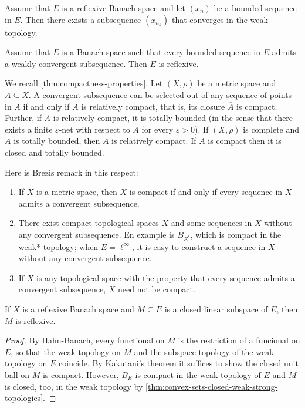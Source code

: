 \documentclass{article}
\theoremstyle{definition}
\numberwithin{equation}{section}
\begin{document}
\begin{thm}
	Assume that $E$ is a reflexive Banach space and let $(x_n)$ be a bounded sequence in $E$. Then there exists a subsequence $(x_{n_k})$ that converges in the weak topology.
\end{thm}
\begin{thm}
	Assume that $E$ is a Banach space such that every bounded sequence in $E$ admits a weakly convergent subsequence. Then $E$ is reflexive.
\end{thm}
\begin{remark}
	We recall \cref{thm:compactness-properties}. Let $(X,\rho)$ be a metric space and $A\subseteq X$. A convergent subsequence can be selected out of any sequence of points in $A$ if and only if $A$ is relatively compact, that is, its closure $\overline{A}$ is compact. Further, if $A$ is relatively compact, it is totally bounded (in the sense that there exists a finite $\varepsilon$-net with respect to $A$ for every $\varepsilon>0$). If $(X,\rho)$ is complete and $A$ is totally bounded, then $A$ is relatively compact. If $A$ is compact then it is closed and totally bounded.
\end{remark}
\begin{remark}Here is Brezis remark in this respect:
	\begin{enumerate}
		\item If $X$ is a metric space, then $X$ is compact if and only if every sequence in $X$ admits a convergent subsequence.
		\item There exist compact topological spaces $X$ and some sequences in $X$ without any convergent subsequence. En example is $B_{E^*}$, which is compact in the weak* topology; when $E=\ell^\infty$, it is easy to construct a sequence in $X$ without any convergent subsequence.
		\item If $X$ is any topological space with the property that every sequence admits a convergent subsequence, $X$ need not be compact.	
	\end{enumerate}
\end{remark}
\begin{prop}
	If $X$ is a reflexive Banach space and $M\subseteq E$ is a closed linear subspace of $E$, then $M$ is reflexive.
\end{prop}
\begin{proof}
	By Hahn-Banach, every functional on $M$ is the restriction of a funcional on $E$, so that the weak topology on $M$ and the subspace topology of the weak topology on $E$ coincide. By Kakutani's theorem it suffices to show the closed unit ball on $M$ is compact. However, $B_E$ is compact in the weak topology of $E$ and $M$ is closed, too, in the weak topology by \cref{thm:convex-sets-closed-weak-strong-topologies}.
\end{proof}
\end{document}
